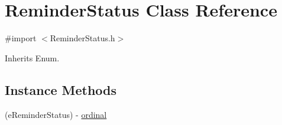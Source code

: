 \hypertarget{interface_reminder_status}{}\section{Reminder\+Status Class Reference}
\label{interface_reminder_status}


{\ttfamily \#import $<$Reminder\+Status.\+h$>$}



Inherits Enum.

\subsection*{Instance Methods}
\begin{DoxyCompactItemize}
\item 
(e\+Reminder\+Status) -\/ \hyperlink{interface_reminder_status_a3bc65188b08cce355a074ace890f31f4}{ordinal}
\end{DoxyCompactItemize}

